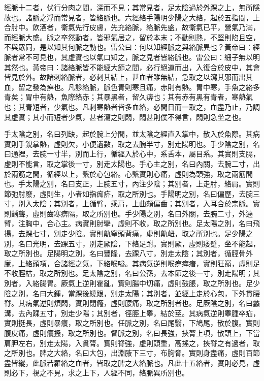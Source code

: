 經脈十二者，伏行分肉之間，深而不見；其常見者，足太陰過於外踝之上，無所隱故也。諸脈之浮而常見者，皆絡脈也。六經絡手陽明少陽之大絡，起於五指間，上合肘中。飲酒者，衛氣先行皮膚，先充絡脈，絡脈先盛，故衛氣已平，營氣乃滿，而經脈大盛。脈之卒然動者，皆邪氣居之，留於本末；不動則熱，不堅則陷且空，不與眾同，是以知其何脈之動也。雷公曰：何以知經脈之與絡脈異也？黃帝曰：經脈者常不可見也，其虛實也以氣口知之，脈之見者皆絡脈也。雷公曰：細子無以明其然也。黃帝曰：諸絡脈皆不能經大節之間，必行絕道而出，入復合於皮中，其會皆見於外。故諸刺絡脈者，必刺其結上，甚血者雖無結，急取之以瀉其邪而出其血，留之發為痹也。凡診絡脈，脈色青則寒且痛，赤則有熱。胃中寒，手魚之絡多青矣；胃中有熱，魚際絡赤；其暴黑者，留久痹也；其有赤有黑有青者，寒熱氣也；其青短者，少氣也。凡刺寒熱者皆多血絡，必間日而一取之，血盡乃止，乃調其虛實；其小而短者少氣，甚者瀉之則悶，悶甚則僕不得言，悶則急坐之也。

手太陰之別，名曰列缺，起於腕上分間，並太陰之經直入掌中，散入於魚際。其病實則手銳掌熱，虛則欠，小便遺數，取之去腕半寸，別走陽明也。手少陰之別，名曰通裡，去腕一寸半，別而上行，循經入於心中，系舌本，屬目系。其實則支膈，虛則不能言，取之掌後一寸，別走太陽也。手心主之別，名曰內關，去腕二寸，出於兩筋之間，循經以上，繫於心包絡。心繫實則心痛，虛則為頭強，取之兩筋間也。手太陽之別，名曰支正，上腕五寸，內注少陰；其別者，上走肘，絡肩。實則節弛肘廢，虛則生，小者如指痂疥，取之所別也。手陽明之別，名曰偏歷，去腕三寸，別入太陰；其別者，上循臂，乘肩，上曲頰偏齒；其別者，入耳合於宗脈。實則齲聾，虛則齒寒痹隔，取之所別也。手少陽之別，名曰外關，去腕二寸，外遶臂，注胸中，合心主。病實則肘攣，虛則不收，取之所別也。足太陽之別，名曰飛揚，去踝七寸，別走少陰。實則鼽窒頭背痛，虛則鼽衄，取之所別也。足少陽之別，名曰光明，去踝五寸，別走厥陰，下絡足跗。實則厥，虛則痿躄，坐不能起，取之所別也。足陽明之別，名曰豐隆，去踝八寸，別走太陰；其別者，循脛骨外廉，上絡頭項，合諸經之氣，下絡喉嗌。其病氣逆則喉痹瘁瘖，實則狂巔，虛則足不收脛枯，取之所別也。足太陰之別，名曰公孫，去本節之後一寸，別走陽明；其別者，入絡腸胃。厥氣上逆則霍亂，實則腸中切痛，虛則鼓脹，取之所別也。足少陰之別，名曰大鍾，當踝後繞跟，別走太陽；其別者，並經上走於心包，下外貫腰脊。其病氣逆則煩悶，實則閉癃，虛則腰痛，取之所別者也。足厥陰之別，名曰蠡溝，去內踝五寸，別走少陽；其別者，徑脛上睾，結於莖。其病氣逆則睾腫卒疝，實則挺長，虛則暴癢，取之所別也。任脈之別，名曰尾翳，下鳩尾，散於腹。實則腹皮痛，虛則癢搔，取之所別也。督脈之別，名曰長強，挾膂上項，散頭上，下當肩胛左右，別走太陽，入貫膂。實則脊強，虛則頭重，高搖之，挾脊之有過者，取之所別也。脾之大絡，名曰大包，出淵腋下三寸，布胸脅。實則身盡痛，虛則百節盡皆縱，此脈若羅絡之血者，皆取之脾之大絡脈也。凡此十五絡者，實則必見，虛則必下，視之不見，求之上下，人經不同，絡脈異所別也。
